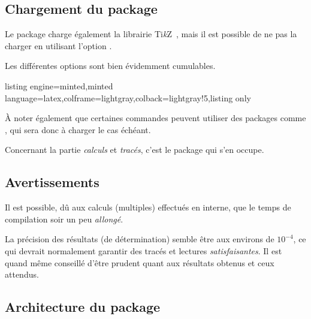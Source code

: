 \documentclass[11pt,a4paper]{ltxdoc}
\providecommand\tikzlogo{Ti\textit{k}Z}
\let\TikZ\tikzlogo
\begin{document}
\pagebreak

\subsection{Chargement du package}

Le package charge également la librairie \TikZ\ , mais il est possible de ne pas la charger en utilisant l'option \MontreCode{[nontikzbabel]}.

\smallskip

Les différentes options sont bien évidemment cumulables.

\begin{tcblisting}{listing engine=minted,minted language=latex,colframe=lightgray,colback=lightgray!5,listing only}
\usepackage{tkz-grapheur}

\usepackage[nonsiunitx]{tkz-grapheur}

\usepackage[nontikzbabel]{tkz-grapheur}

\usepackage[nonpgfplots]{tkz-grapheur}
\pgfplotsset{compat=...}
\end{tcblisting}

À noter également que certaines commandes peuvent utiliser des packages comme , qui sera donc à charger le cas échéant.

\smallskip

Concernant la partie \textit{calculs} et \textit{tracés}, c'est le package  qui s'en occupe.

\subsection{Avertissements}

Il est possible, dû aux calculs (multiples) effectués en interne, que le temps de compilation soir un peu \textit{allongé}.

\smallskip

La précision des résultats (de détermination) semble être aux environs de $10^{-4}$, ce qui devrait normalement garantir des tracés et lectures \textit{satisfaisantes}. Il est quand même conseillé d'être prudent quant aux résultats obtenus et ceux attendus.

\subsection{Architecture du package}
\end{document}
